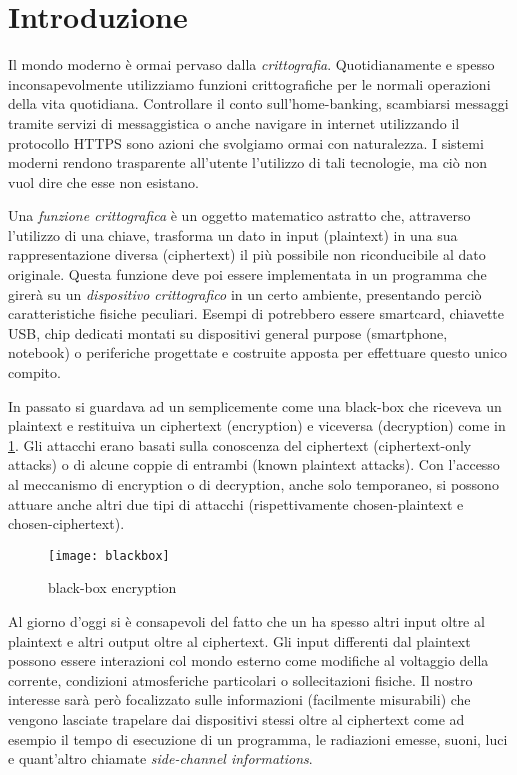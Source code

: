 \chapter*{Introduzione}
	Il mondo moderno è ormai pervaso dalla \emph{crittografia}. Quotidianamente e spesso inconsapevolmente utilizziamo funzioni crittografiche per le normali operazioni della vita quotidiana. Controllare il conto sull'home-banking, scambiarsi messaggi tramite servizi di messaggistica o anche navigare in internet utilizzando il protocollo \acs{HTTPS} sono azioni che svolgiamo ormai con naturalezza. I sistemi moderni rendono trasparente all'utente l'utilizzo di tali tecnologie, ma ciò non vuol dire che esse non esistano.
	
	Una \emph{funzione crittografica} è un oggetto matematico astratto che, attraverso l'utilizzo di una chiave, trasforma un dato in input (plaintext) in una sua rappresentazione diversa (ciphertext) il più possibile non riconducibile al dato originale. Questa funzione deve poi essere implementata in un programma che girerà su un \emph{dispositivo crittografico} in un certo ambiente, presentando perciò caratteristiche fisiche peculiari. Esempi di \dispp potrebbero essere smartcard, chiavette \acs{USB}, chip dedicati montati su dispositivi general purpose (smartphone, notebook) o periferiche progettate e costruite apposta per effettuare questo unico compito.
	
	In passato si guardava ad un \disps semplicemente come una black-box che riceveva un plaintext e restituiva un ciphertext (encryption) e viceversa (decryption) come in \cref{fig:blackbox}. Gli attacchi erano basati sulla conoscenza del ciphertext (ciphertext-only attacks) o di alcune coppie di entrambi (known plaintext attacks). Con l'accesso al meccanismo di encryption o di decryption, anche solo temporaneo, si possono attuare anche altri due tipi di attacchi (rispettivamente chosen-plaintext e chosen-ciphertext)\cite{dispenseCS}.
	
	\begin{figure}
		\begin{center}
			\texttt{[image: blackbox]}
			\caption{black-box encryption}
			\label{fig:blackbox}
		\end{center}
	\end{figure}
	
	Al giorno d'oggi si è consapevoli del fatto che un \disps ha spesso altri input oltre al plaintext e altri output oltre al ciphertext. Gli input differenti dal plaintext possono essere interazioni col mondo esterno come modifiche al voltaggio della corrente, condizioni atmosferiche particolari o sollecitazioni fisiche. Il nostro interesse sarà però focalizzato sulle informazioni (facilmente misurabili) che vengono lasciate trapelare dai dispositivi stessi oltre al ciphertext come ad esempio il tempo di esecuzione di un programma, le radiazioni emesse, suoni, luci e quant'altro chiamate \emph{side-channel informations}.
	 
